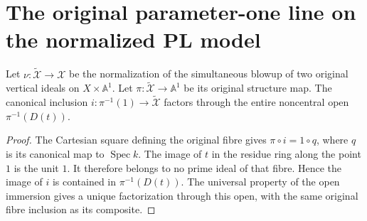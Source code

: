\section{The original parameter-one line on the normalized PL model}

\begin{lemma}
\label{lem:pl-original-normalized-fibre-one-noncentral}
\leanok
{}
Let $\nu:\widetilde{\mathcal X}\to\mathcal X$ be the normalization of the
simultaneous blowup of two original vertical ideals on $X\times\mathbb A^1$.
Let $\pi:\widetilde{\mathcal X}\to\mathbb A^1$ be its original structure map.
The canonical inclusion $i:\pi^{-1}(1)\to\widetilde{\mathcal X}$ factors
through the entire noncentral open $\pi^{-1}(D(t))$.
\end{lemma}
\begin{proof}
The Cartesian square defining the original fibre gives
$\pi\circ i=1\circ q$, where $q$ is its canonical map to $\operatorname{Spec}k$.
The image of $t$ in the residue ring along the point $1$ is the unit $1$.
It therefore belongs to no prime ideal of that fibre. Hence the image of $i$
is contained in $\pi^{-1}(D(t))$. The universal property of the open immersion
gives a unique factorization through this open, with the same original fibre
inclusion as its composite.
\end{proof}

